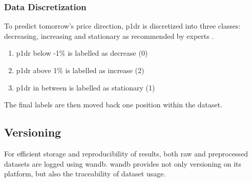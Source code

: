 \subsubsection{Data Discretization}
\label{subsub:Data_Discretization}
To predict tomorrow's price direction, \gls{p1dr} is discretized into three classes: decreasing, increasing and stationary as recommended by experts \citep{attanasio2019quantitative}.

\begin{enumerate}
    \item \gls{p1dr} below -1\% is labelled as decrease (0)
    \item \gls{p1dr} above 1\% is labelled as increase (2)
    \item \gls{p1dr} in between is labelled as stationary (1)
\end{enumerate}

\noindent
The final labels are then moved back one position within the dataset.

\subsection{Versioning}
\label{sub:Versioning}
For efficient storage and reproducibility of results,  both raw and preprocessed datasets are logged using \gls{wandb}. \gls{wandb} provides not only versioning on its platform, but also the traceability of dataset usage.